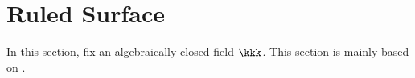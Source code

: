 \section{Ruled Surface}

In this section, fix an algebraically closed field $\kkk$.
This section is mainly based on \cite[Chapter V.2]{Har77}.







